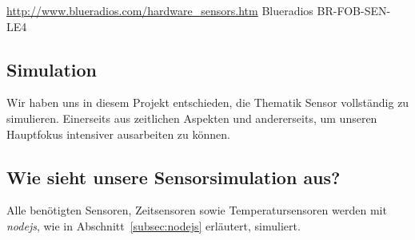 		\url{http://www.blueradios.com/hardware_sensors.htm}
		{Blueradios BR-FOB-SEN-LE4}
	\par

\subsection{Simulation}

Wir haben uns in diesem Projekt entschieden, die Thematik Sensor vollständig zu
simulieren. Einerseits aus zeitlichen Aspekten und andererseits, um unseren
Hauptfokus intensiver ausarbeiten zu können.

\subsection{Wie sieht unsere Sensorsimulation aus?} 

Alle benötigten Sensoren, Zeitsensoren sowie Temperatursensoren werden mit
\emph{nodejs}, wie in Abschnitt~\ref{subsec:nodejs} erläutert, simuliert.